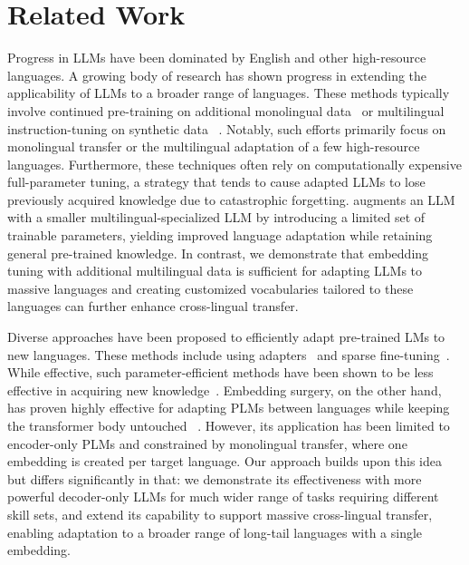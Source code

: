 \section{Related Work}

Progress in LLMs have been dominated by English and other high-resource languages.
A growing body of research has shown progress in extending the applicability of LLMs to a broader range of languages. These methods typically involve continued pre-training on additional monolingual data~\citep{cui2024efficienteffectivetextencoding,zhao2024llamaenglishempiricalstudy} or multilingual instruction-tuning on synthetic data ~\citep{chen-etal-2024-monolingual,ustun-etal-2024-aya,aryabumi2024aya}. Notably, such efforts primarily focus on monolingual transfer or the multilingual adaptation of a few high-resource languages. Furthermore, these techniques often rely on computationally expensive full-parameter tuning, a strategy that tends to cause adapted LLMs to lose previously acquired knowledge due to catastrophic forgetting. \citet{bansal2024llm} augments an LLM with a smaller multilingual-specialized LLM by introducing a limited set of trainable parameters, yielding improved language adaptation while retaining general pre-trained knowledge. In contrast, we demonstrate that embedding tuning with additional multilingual data is sufficient for adapting LLMs to massive languages and creating customized vocabularies tailored to these languages can further enhance cross-lingual transfer.

Diverse approaches have been proposed to efficiently adapt pre-trained LMs to new languages. These methods include using adapters~\citep{pfeiffer-etal-2020-mad,pfeiffer-etal-2022-lifting,yong-etal-2023-bloom,liu2022fewshot} and sparse fine-tuning~\citep{ansell-etal-2022-composable}. While effective, such parameter-efficient methods have been shown to be less effective in acquiring new knowledge~\citep{biderman2024lora}. Embedding surgery, on the other hand, has proven highly effective for adapting PLMs between languages while keeping the transformer body untouched ~\citep{artetxe-etal-2020-cross,de-vries-nissim-2021-good,marchisio-etal-2023-mini,chen2023improving}. However, its application has been limited to encoder-only PLMs and constrained by monolingual transfer, where one embedding is created per target language. Our \ouradapter approach builds upon this idea but differs significantly in that: we demonstrate its effectiveness with more powerful decoder-only LLMs for much wider range of tasks requiring different skill sets, and extend its capability to support massive cross-lingual transfer, enabling adaptation to a broader range of long-tail languages with a single embedding.

